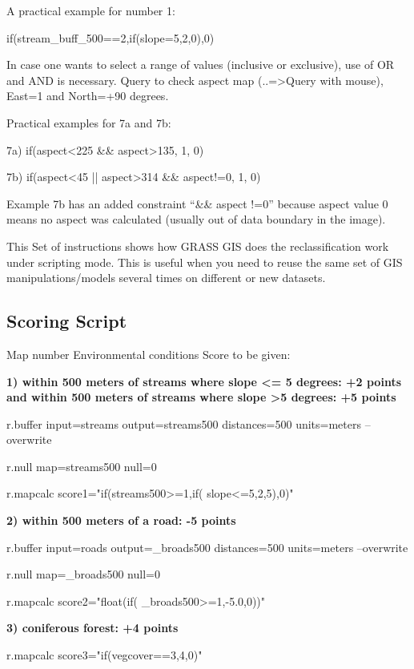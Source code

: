 A practical example for number 1:
\begin{smallverbatim}
if(stream_buff_500==2,if(slope=5,2,0),0)
\end{smallverbatim}
In case one wants to select a range of values (inclusive or exclusive), use of OR and AND is necessary. Query to check aspect map (..=>Query with mouse), East=1 and North=+90 degrees.

Practical examples for 7a and 7b:
\begin{smallverbatim}
7a) if(aspect<225 && aspect>135, 1, 0)

7b) if(aspect<45 || aspect>314 && aspect!=0, 1, 0)
\end{smallverbatim}
Example 7b has an added constraint ``\&\& aspect !=0'' because aspect value 0 means no aspect was calculated (usually out of data boundary in
the image).

This Set of instructions shows how GRASS GIS does the reclassification work under scripting mode. This is useful when you need to reuse the same set of GIS manipulations/models several times on different or new datasets.

\subsection{Scoring Script}

Map number Environmental conditions Score to be given:

\textbf{
1) within 500 meters of streams where slope <= 5 degrees: +2 points and within 500 meters of streams where slope >5 degrees: +5 points}
\begin{smallverbatim}
r.buffer input=streams output=streams500
 distances=500 units=meters --overwrite

r.null map=streams500 null=0

r.mapcalc score1="if(streams500>=1,if(
 slope<=5,2,5),0)"
\end{smallverbatim}

\textbf{
2) within 500 meters of a road: -5 points}
\begin{smallverbatim}
r.buffer input=roads output=_broads500
 distances=500 units=meters --overwrite

r.null map=_broads500 null=0

r.mapcalc score2="float(if(
 _broads500>=1,-5.0,0))"
\end{smallverbatim}

\textbf{
3) coniferous forest: +4 points}
\begin{smallverbatim}
r.mapcalc score3="if(vegcover==3,4,0)"
\end{smallverbatim}

